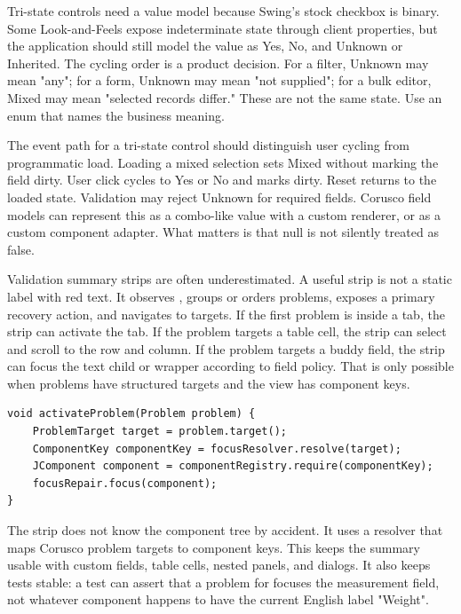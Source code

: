 Tri-state controls need a value model because Swing's stock checkbox is binary. Some
Look-and-Feels expose indeterminate state through client properties, but the application
should still model the value as Yes, No, and Unknown or Inherited. The cycling order is
a product decision. For a filter, Unknown may mean "any"; for a form, Unknown may mean
"not supplied"; for a bulk editor, Mixed may mean "selected records differ." These are
not the same state. Use an enum that names the business meaning.

The event path for a tri-state control should distinguish user cycling from programmatic
load. Loading a mixed selection sets Mixed without marking the field dirty. User click
cycles to Yes or No and marks dirty. Reset returns to the loaded state. Validation may
reject Unknown for required fields. Corusco field models can represent this as a
combo-like value with a custom renderer, or as a custom component adapter. What matters
is that null is not silently treated as false.

Validation summary strips are often underestimated. A useful strip is not a static label
with red text. It observes , groups or orders problems, exposes a
primary recovery action, and navigates to targets. If the first problem is inside a tab,
the strip can activate the tab. If the problem targets a table cell, the strip can
select and scroll to the row and column. If the problem targets a buddy field, the strip
can focus the text child or wrapper according to field policy. That is only possible
when problems have structured targets and the view has component keys.

\begin{lstlisting}[caption={A validation strip routes by problem target.}]
void activateProblem(Problem problem) {
    ProblemTarget target = problem.target();
    ComponentKey componentKey = focusResolver.resolve(target);
    JComponent component = componentRegistry.require(componentKey);
    focusRepair.focus(component);
}
\end{lstlisting}

The strip does not know the component tree by accident. It uses a resolver that maps
Corusco problem targets to component keys. This keeps the summary usable with custom
fields, table cells, nested panels, and dialogs. It also keeps tests stable: a test can
assert that a problem for
 focuses the measurement field, not whatever
component happens to have the current English label "Weight".

